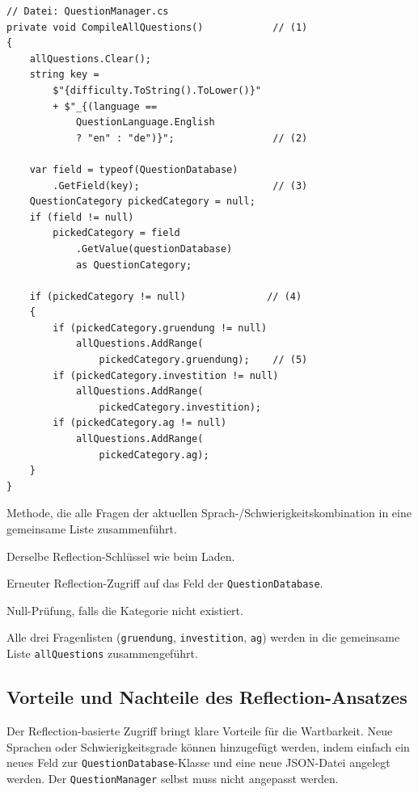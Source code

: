 \documentclass[12pt,a4paper]{article}
\begin{document}
\begin{lstlisting}
// Datei: QuestionManager.cs
private void CompileAllQuestions()            // (1)
{
    allQuestions.Clear();
    string key =
        $"{difficulty.ToString().ToLower()}"
        + $"_{(language ==
            QuestionLanguage.English
            ? "en" : "de")}";                 // (2)

    var field = typeof(QuestionDatabase)
        .GetField(key);                       // (3)
    QuestionCategory pickedCategory = null;
    if (field != null)
        pickedCategory = field
            .GetValue(questionDatabase)
            as QuestionCategory;

    if (pickedCategory != null)              // (4)
    {
        if (pickedCategory.gruendung != null)
            allQuestions.AddRange(
                pickedCategory.gruendung);    // (5)
        if (pickedCategory.investition != null)
            allQuestions.AddRange(
                pickedCategory.investition);
        if (pickedCategory.ag != null)
            allQuestions.AddRange(
                pickedCategory.ag);
    }
}
\end{lstlisting}

\begin{description}[leftmargin=2em, labelwidth=1.5em]
    \item[(1)] Methode, die alle Fragen der aktuellen Sprach-/Schwierigkeitskombination in eine gemeinsame Liste zusammenführt.
    \item[(2)] Derselbe Reflection-Schlüssel wie beim Laden.
    \item[(3)] Erneuter Reflection-Zugriff auf das Feld der \texttt{QuestionDatabase}.
    \item[(4)] Null-Prüfung, falls die Kategorie nicht existiert.
    \item[(5)] Alle drei Fragenlisten (\texttt{gruendung}, \texttt{investition}, \texttt{ag}) werden in die gemeinsame Liste \texttt{allQuestions} zusammengeführt.
\end{description}

\subsection{Vorteile und Nachteile des Reflection-Ansatzes}

Der Reflection-basierte Zugriff bringt klare Vorteile für die Wartbarkeit. Neue Sprachen oder Schwierigkeitsgrade können hinzugefügt werden, indem einfach ein neues Feld zur \texttt{QuestionDatabase}-Klasse und eine neue JSON-Datei angelegt werden. Der \texttt{QuestionManager} selbst muss nicht angepasst werden.
\end{document}
